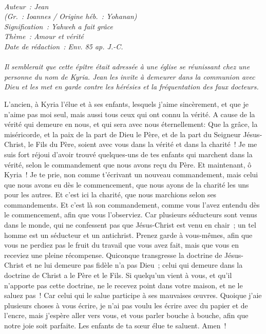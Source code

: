 \BFont
\noindent\hrulefill
{\footnotesize
\textit{
\bigskip
{\centering{}
\\Auteur~: Jean
\\(Gr.~: Ioannes / Origine héb.~: Yohanan)
\\Signification~: Yahweh a fait grâce
\\Thème~: Amour et vérité
\\Date de rédaction~: Env. 85 ap. J.-C.\\}
}
\textit{
\\Il semblerait que cette épître était adressée à une église se réunissant chez une personne du nom de Kyria. Jean les invite à demeurer dans la communion avec Dieu et les met en garde contre les hérésies et la fréquentation des faux docteurs.\bigskip
}
}
\par\nobreak\noindent\hrulefill
\begin{multicols}{2}
\VerseOne{}L'ancien, à Kyria l'élue et à ses enfants, lesquels j'aime sincèrement, et que je n'aime pas moi seul, mais aussi tous ceux qui ont connu la vérité.
A cause de la vérité qui demeure en nous, et qui sera avec nous éternellement:
Que la grâce, la miséricorde, et la paix de la part de Dieu le Père, et de la part du Seigneur Jésus-Christ, le Fils du Père, soient avec vous dans la vérité et dans la charité~!
Je me suis fort réjoui d'avoir trouvé quelques-uns de tes enfants qui marchent dans la vérité, selon le commandement que nous avons reçu du Père.
Et maintenant, ô Kyria~! Je te prie, non comme t'écrivant un nouveau commandement, mais celui que nous avons eu dès le commencement, que nous ayons de la charité les uns pour les autres.
Et c'est ici la charité, que nous marchions selon ses commandements. Et c'est là son commandement, comme vous l'avez entendu dès le commencement, afin que vous l'observiez.
Car plusieurs séducteurs sont venus dans le monde, qui ne confessent pas que Jésus-Christ est venu en chair~; un tel homme est un séducteur et un antichrist.
Prenez garde à vous-mêmes, afin que vous ne perdiez pas le fruit du travail que vous avez fait, mais que vous en receviez une pleine récompense.
Quiconque transgresse la doctrine de Jésus-Christ et ne lui demeure pas fidèle n'a pas Dieu~; celui qui demeure dans la doctrine de Christ a le Père et le Fils.
Si quelqu'un vient à vous, et qu'il n'apporte pas cette doctrine, ne le recevez point dans votre maison, et ne le saluez pas~!
Car celui qui le salue participe à ses mauvaises œuvres.
Quoique j'aie plusieurs choses à vous écrire, je n'ai pas voulu les écrire avec du papier et de l'encre, mais j'espère aller vers vous, et vous parler bouche à bouche, afin que notre joie soit parfaite.
Les enfants de ta sœur élue te saluent. Amen~!
\PPE{}
\end{multicols}
